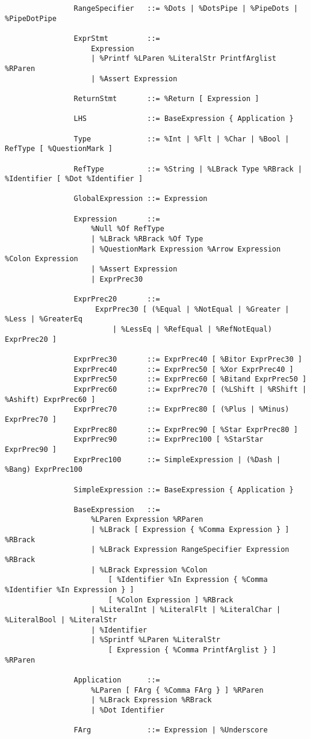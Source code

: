 \documentclass{article}
\begin{document}
\begin{small}
\begin{verbatim}
				RangeSpecifier   ::= %Dots | %DotsPipe | %PipeDots | %PipeDotPipe
				                 
				ExprStmt         ::=
				    Expression
				    | %Printf %LParen %LiteralStr PrintfArglist %RParen
				    | %Assert Expression
				                 
				ReturnStmt       ::= %Return [ Expression ]
				                 
				LHS              ::= BaseExpression { Application }
				                 
				Type             ::= %Int | %Flt | %Char | %Bool | RefType [ %QuestionMark ]
				                 
				RefType          ::= %String | %LBrack Type %RBrack | %Identifier [ %Dot %Identifier ]
				                 
				GlobalExpression ::= Expression
			
				Expression       ::=
				    %Null %Of RefType
				    | %LBrack %RBrack %Of Type
				    | %QuestionMark Expression %Arrow Expression %Colon Expression
 				    | %Assert Expression
				    | ExprPrec30
				
				ExprPrec20       ::=
				     ExprPrec30 [ (%Equal | %NotEqual | %Greater | %Less | %GreaterEq
				         | %LessEq | %RefEqual | %RefNotEqual) ExprPrec20 ]
				         
				ExprPrec30       ::= ExprPrec40 [ %Bitor ExprPrec30 ]
				ExprPrec40       ::= ExprPrec50 [ %Xor ExprPrec40 ]
				ExprPrec50       ::= ExprPrec60 [ %Bitand ExprPrec50 ]
				ExprPrec60       ::= ExprPrec70 [ (%LShift | %RShift | %Ashift) ExprPrec60 ]
				ExprPrec70       ::= ExprPrec80 [ (%Plus | %Minus) ExprPrec70 ]
				ExprPrec80       ::= ExprPrec90 [ %Star ExprPrec80 ]
				ExprPrec90       ::= ExprPrec100 [ %StarStar ExprPrec90 ]
				ExprPrec100      ::= SimpleExpression | (%Dash | %Bang) ExprPrec100
				                 
				SimpleExpression ::= BaseExpression { Application }
				
				BaseExpression   ::=
				    %LParen Expression %RParen
				    | %LBrack [ Expression { %Comma Expression } ] %RBrack
				    | %LBrack Expression RangeSpecifier Expression %RBrack
				    | %LBrack Expression %Colon
				        [ %Identifier %In Expression { %Comma %Identifier %In Expression } ]
				        [ %Colon Expression ] %RBrack
				    | %LiteralInt | %LiteralFlt | %LiteralChar | %LiteralBool | %LiteralStr
				    | %Identifier
				    | %Sprintf %LParen %LiteralStr
				        [ Expression { %Comma PrintfArglist } ] %RParen
				                 
				Application      ::=
				    %LParen [ FArg { %Comma FArg } ] %RParen
				    | %LBrack Expression %RBrack
				    | %Dot Identifier
				                 
				FArg             ::= Expression | %Underscore
			\end{verbatim}\end{small}
	
\end{document}
